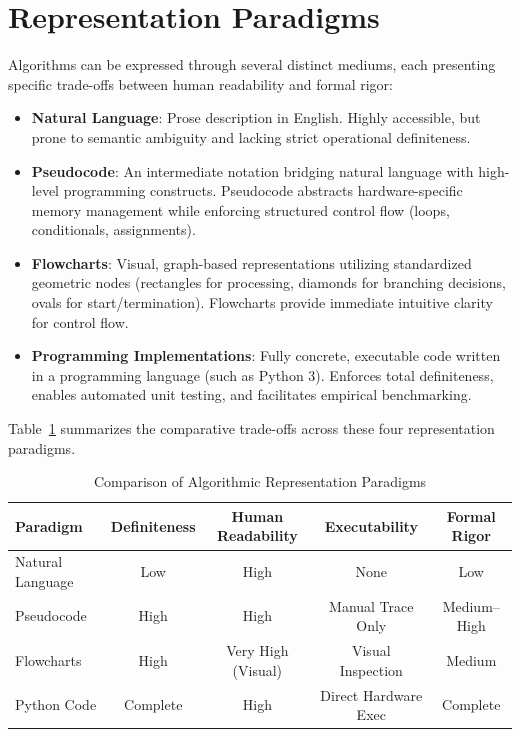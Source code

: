 \documentclass[11pt,a4paper,oneside]{report}
\theoremstyle{definition}
\begin{document}
\section{Representation Paradigms}
Algorithms can be expressed through several distinct mediums, each presenting specific trade-offs between human readability and formal rigor:
\begin{itemize}
    \item \textbf{Natural Language}: Prose description in English. Highly accessible, but prone to semantic ambiguity and lacking strict operational definiteness.
    \item \textbf{Pseudocode}: An intermediate notation bridging natural language with high-level programming constructs. Pseudocode abstracts hardware-specific memory management while enforcing structured control flow (loops, conditionals, assignments).
    \item \textbf{Flowcharts}: Visual, graph-based representations utilizing standardized geometric nodes (rectangles for processing, diamonds for branching decisions, ovals for start/termination). Flowcharts provide immediate intuitive clarity for control flow.
    \item \textbf{Programming Implementations}: Fully concrete, executable code written in a programming language (such as Python 3). Enforces total definiteness, enables automated unit testing, and facilitates empirical benchmarking.
\end{itemize}

Table~\ref{tab:representation_comparison} summarizes the comparative trade-offs across these four representation paradigms.

\begin{table}[htbp]
\centering
\caption{Comparison of Algorithmic Representation Paradigms}
\label{tab:representation_comparison}
\small
\begin{tabular*}{\textwidth}{@{\extracolsep{\fill}}lcccc}
\toprule
\textbf{Paradigm} & \textbf{Definiteness} & \textbf{Human Readability} & \textbf{Executability} & \textbf{Formal Rigor} \\
\midrule
Natural Language  & Low                   & High                       & None                   & Low                   \\
Pseudocode        & High                  & High                       & Manual Trace Only      & Medium--High          \\
Flowcharts        & High                  & Very High (Visual)         & Visual Inspection      & Medium                \\
Python Code       & Complete              & High                       & Direct Hardware Exec   & Complete              \\
\bottomrule
\end{tabular*}
\end{table}
\end{document}
